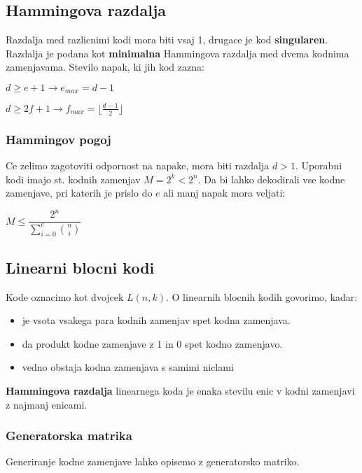 \documentclass{article}
\begin{document}
\begin{multicols}{4}
\subsection{Hammingova razdalja}
Razdalja med razlicnimi kodi mora biti vsaj 1, drugace je kod \textbf{singularen}.
Razdalja je podana kot \textbf{minimalna} Hammingova razdalja med dvema kodnima zamenjavama.
Stevilo napak, ki jih kod zazna:
\begin{center}
    $d \geq e + 1 \rightarrow e_{max} = d-1$
\end{center}
\begin{center}
    $d \geq 2f + 1 \rightarrow f_{max} = \lfloor \frac{d-1}{2} \rfloor$
\end{center}

\subsubsection{Hammingov pogoj}
Ce zelimo zagotoviti odpornost na napake,
mora biti razdalja $d > 1$. Uporabni kodi imajo st. kodnih zamenjav $M = 2^k < 2^n$.
Da bi lahko dekodirali vse kodne zamenjave, pri katerih je prislo do $e$ ali manj napak
mora veljati:
\begin{center}
    \begin{math}
        M \leq \dfrac{2^n}{\sum_{i=0}^e{n \choose i}}
    \end{math}
\end{center}

\subsection{Linearni blocni kodi}
Kode oznacimo kot dvojcek $L(n, k)$. 
O linearnih blocnih kodih govorimo, kadar:
\begin{itemize}
    \item je vsota vsakega para kodnih zamenjav spet kodna zamenjava.
    \item da produkt kodne zamenjave z 1 in 0 spet kodno zamenjavo.
    \item vedno obstaja kodna zamenjava s samimi niclami
\end{itemize}
\textbf{Hammingova razdalja} linearnega koda je enaka stevilu enic v kodni zamenjavi
z najmanj enicami.

\subsubsection{Generatorska matrika}
Generiranje kodne zamenjave lahko opisemo z generatorsko matriko.


\end{multicols}
\end{document}
